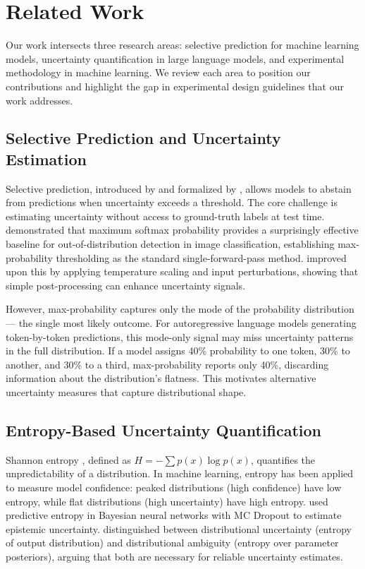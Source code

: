 \section{Related Work}

Our work intersects three research areas: selective prediction for machine learning models, uncertainty quantification in large language models, and experimental methodology in machine learning. We review each area to position our contributions and highlight the gap in experimental design guidelines that our work addresses.

\subsection{Selective Prediction and Uncertainty Estimation}

Selective prediction, introduced by \citet{Chow1957} and formalized by \citet{ElYaniv2010}, allows models to abstain from predictions when uncertainty exceeds a threshold. The core challenge is estimating uncertainty without access to ground-truth labels at test time. \citet{Hendrycks2017} demonstrated that maximum softmax probability provides a surprisingly effective baseline for out-of-distribution detection in image classification, establishing max-probability thresholding as the standard single-forward-pass method. \citet{Liang2018} improved upon this by applying temperature scaling and input perturbations, showing that simple post-processing can enhance uncertainty signals.

However, max-probability captures only the mode of the probability distribution --- the single most likely outcome. For autoregressive language models generating token-by-token predictions, this mode-only signal may miss uncertainty patterns in the full distribution. If a model assigns 40\% probability to one token, 30\% to another, and 30\% to a third, max-probability reports only 40\%, discarding information about the distribution's flatness. This motivates alternative uncertainty measures that capture distributional shape.

\subsection{Entropy-Based Uncertainty Quantification}

Shannon entropy \citep{Shannon1948}, defined as $H = -\sum p(x) \log p(x)$, quantifies the unpredictability of a distribution. In machine learning, entropy has been applied to measure model confidence: peaked distributions (high confidence) have low entropy, while flat distributions (high uncertainty) have high entropy. \citet{Gal2016} used predictive entropy in Bayesian neural networks with MC Dropout to estimate epistemic uncertainty. \citet{Malinin2018} distinguished between distributional uncertainty (entropy of output distribution) and distributional ambiguity (entropy over parameter posteriors), arguing that both are necessary for reliable uncertainty estimates.

